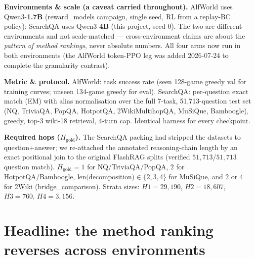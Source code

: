 \documentclass[11pt]{article}
\begin{document}
\textbf{Environments \& scale (a caveat carried throughout).} AlfWorld uses Qwen3-\textbf{1.7B}
(reward\_models campaign, single seed, RL from a replay-BC policy); SearchQA uses Qwen3-\textbf{4B}
(this project, seed 0). The two are different environments and not scale-matched --- cross-environment
claims are about the \emph{pattern of method rankings}, never absolute numbers. All four arms now run in both
environments (the AlfWorld token-PPO leg was added 2026-07-24 to complete the granularity contrast).

\textbf{Metric \& protocol.} AlfWorld: task success rate (seen 128-game greedy val for training
curves; unseen 134-game greedy for eval). SearchQA: per-question exact match (EM) with alias
normalisation over the full 7-task, 51{,}713-question test set (NQ, TriviaQA, PopQA, HotpotQA,
2WikiMultihopQA, MuSiQue, Bamboogle), greedy, top-3 wiki-18 retrieval, 4-turn cap. Identical harness
for every checkpoint.

\textbf{Required hops ($H_{\text{gold}}$).} The SearchQA packing had stripped the datasets to
question+answer; we re-attached the annotated reasoning-chain length by an exact positional join to
the original FlashRAG splits (verified $51{,}713/51{,}713$ question match). $H_{\text{gold}}{=}1$ for
NQ/TriviaQA/PopQA, $2$ for HotpotQA/Bamboogle, $\text{len(decomposition)}\in\{2,3,4\}$ for MuSiQue,
and $2$ or $4$ for 2Wiki (bridge\_comparison). Strata sizes: $H1{=}29{,}190$, $H2{=}18{,}607$,
$H3{=}760$, $H4{=}3{,}156$.

\section{Headline: the method ranking reverses across environments}
\end{document}
